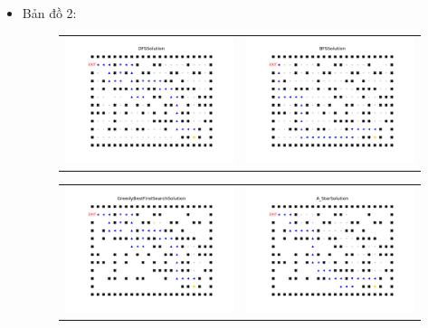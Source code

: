\documentclass[11pt]{article} %
\begin{document}
\begin{itemize}
	
	\newpage
	\item Bản đồ 2:
	\begin{figure}[h] \label{bd2}
		\centering
		\begin{tabular}{cc}
			\includegraphics[width=8cm]{Figures/fg2_dfs.png} &
			\includegraphics[width=8cm]{Figures/fg2_bfs.png} \\
		\end{tabular}
	\end{figure}
	\begin{figure}[h] \label{Hình 2}
		\centering
		\begin{tabular}{cc}
			\includegraphics[width=8cm]{Figures/fg2_gbfs.png} &
			\includegraphics[width=8cm]{Figures/fg2_astar.png}
		\end{tabular}
	\end{figure}
	

\end{itemize}
\end{document}
